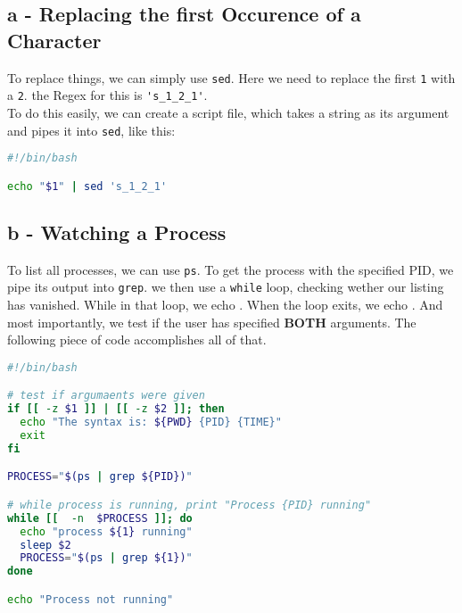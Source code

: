\documentclass[a4paper, 11pt]{article}
\begin{document}
    \subsection{a - Replacing the first Occurence of a Character}
    To replace things, we can simply use \texttt{sed}. Here we need to replace the first \texttt{1} 
    with a \texttt{2}. the Regex for this is \lstinline{'s_1_2_1'}. \\
    To do this easily, we can create a script file, which takes a string as its argument and pipes 
    it into \texttt{sed}, like this:
    \begin{lstlisting}[language=Bash]
#!/bin/bash

echo "$1" | sed 's_1_2_1'
    \end{lstlisting}

    \subsection{b - Watching a Process}
    To list all processes, we can use \texttt{ps}. To get the process with the specified PID, we pipe
    its output into \texttt{grep}. we then use a \texttt{while} loop, checking wether our listing has vanished. 
    While in that loop, we echo \texttt{}.
    When the loop exits, we echo \texttt{\color{stringColor}{"Process not running."}}. And most importantly, we
    test if the user has specified \textbf{BOTH} arguments. The following piece of code accomplishes all of that.

    \begin{lstlisting}[language=Bash,caption={The Bash code that keeps on giving}]
#!/bin/bash

# test if argumaents were given
if [[ -z $1 ]] | [[ -z $2 ]]; then
  echo "The syntax is: ${PWD} {PID} {TIME}"
  exit
fi

PROCESS="$(ps | grep ${PID})"

# while process is running, print "Process {PID} running"
while [[  -n  $PROCESS ]]; do
  echo "process ${1} running"
  sleep $2
  PROCESS="$(ps | grep ${1})"
done

echo "Process not running"
    \end{lstlisting}
    \newpage

\end{document}
